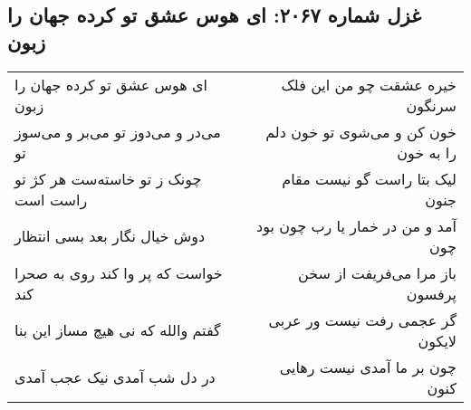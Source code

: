 \begin{center}
\section*{غزل شماره ۲۰۶۷: ای هوس عشق تو کرده جهان را زبون}
\label{sec:2067}
\begin{longtable}{l p{0.5cm} r}
ای هوس عشق تو کرده جهان را زبون
&&
خیره عشقت چو من این فلک سرنگون
\\
می‌در و می‌دوز تو می‌بر و می‌سوز تو
&&
خون کن و می‌شوی تو خون دلم را به خون
\\
چونک ز تو خاسته‌ست هر کژ تو راست است
&&
لیک بتا راست گو نیست مقام جنون
\\
دوش خیال نگار بعد بسی انتظار
&&
آمد و من در خمار یا رب چون بود چون
\\
خواست که پر وا کند روی به صحرا کند
&&
باز مرا می‌فریفت از سخن پرفسون
\\
گفتم والله که نی هیچ مساز این بنا
&&
گر عجمی رفت نیست ور عربی لایکون
\\
در دل شب آمدی نیک عجب آمدی
&&
چون بر ما آمدی نیست رهایی کنون
\\
\end{longtable}
\end{center}
